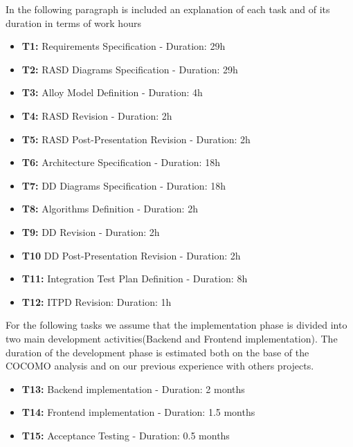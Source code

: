 \documentclass[11pt,titlepage]{article} %
\begin{document}
\noindent In the following paragraph is included an explanation of each task and of its duration in terms of work hours
\begin{itemize}
 \item \textbf{T1:} Requirements Specification - Duration: 29h
 \item \textbf{T2:} RASD Diagrams Specification - Duration: 29h
 \item \textbf{T3:} Alloy Model Definition - Duration: 4h
 \item \textbf{T4:} RASD Revision - Duration: 2h
 \item \textbf{T5:} RASD Post-Presentation Revision - Duration: 2h
 \item \textbf{T6:} Architecture Specification - Duration: 18h
 \item \textbf{T7:} DD Diagrams Specification - Duration: 18h
 \item \textbf{T8:} Algorithms Definition - Duration: 2h
 \item \textbf{T9:} DD Revision - Duration: 2h
 \item \textbf{T10} DD Post-Presentation Revision - Duration: 2h
 \item \textbf{T11:} Integration Test Plan Definition - Duration: 8h
 \item \textbf{T12:} ITPD Revision: Duration: 1h
\end{itemize}
 For the following tasks we assume that the implementation phase is divided into two main development activities(Backend and Frontend implementation).
 The duration of the development phase is estimated both on the base of the COCOMO analysis and on our previous experience with others projects.\newline
\begin{itemize}
 \item \textbf{T13:} Backend implementation - Duration: 2 months
 \item \textbf{T14:} Frontend implementation - Duration: 1.5 months
 \item \textbf{T15:} Acceptance Testing - Duration: 0.5 months
\end{itemize}

 

\newpage
\end{document}
